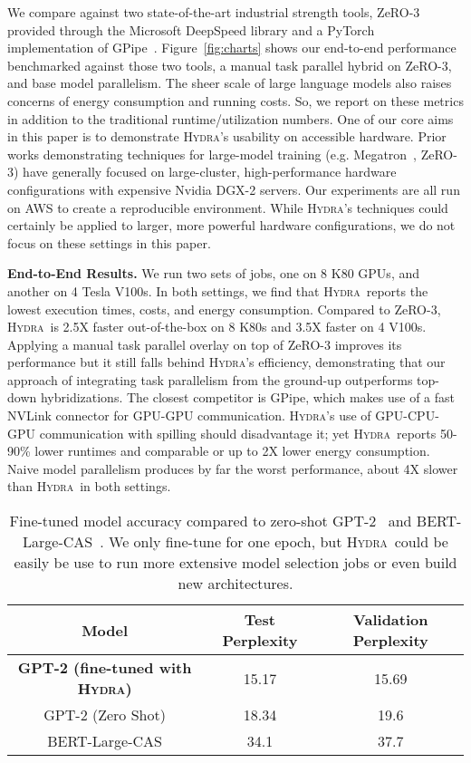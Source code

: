 \documentclass{article}
\newcommand{\system}{\textsc{Hydra}}
\begin{document}
{{We compare against two state-of-the-art industrial strength tools, ZeRO-3~\cite{zeroOpt,zeroDeep} provided through the Microsoft DeepSpeed library and a PyTorch implementation of GPipe~\cite{gpipe,torchgpipe}. Figure~\ref{fig:charts} shows our end-to-end performance benchmarked against those two tools, a manual task parallel hybrid on ZeRO-3, and base model parallelism. The sheer scale of large language models also raises concerns of energy consumption and running costs. So, we report on these metrics in addition to the traditional runtime/utilization numbers. One of our core aims in this paper is to demonstrate \system's usability on accessible hardware. Prior works demonstrating techniques for large-model training (e.g. Megatron~\cite{shoeybi2019megatron}, ZeRO-3) have generally focused on large-cluster, high-performance hardware configurations with expensive Nvidia DGX-2 servers. Our experiments are all run on AWS to create a reproducible environment. While \system's techniques could certainly be applied to larger, more powerful hardware configurations, we do not focus on these settings in this paper. 

\textbf{End-to-End Results.} We run two sets of jobs, one on 8 K80 GPUs, and another on 4 Tesla V100s.  In both settings, we find that \system~reports the lowest execution times, costs, and energy consumption. Compared to ZeRO-3, \system~is 2.5X faster out-of-the-box on 8 K80s and 3.5X faster on 4 V100s. Applying a manual task parallel overlay on top of ZeRO-3 improves its performance but it still falls behind \system's efficiency, demonstrating that our approach of integrating task parallelism from the ground-up outperforms top-down hybridizations. The closest competitor is GPipe, which makes use of a fast NVLink connector for GPU-GPU communication. \system's use of GPU-CPU-GPU communication with spilling should disadvantage it; yet \system~reports 50-90\% lower runtimes and comparable or up to 2X lower energy consumption. Naive model parallelism produces by far the worst performance, about 4X slower than \system~in both settings.

\begin{table}
\label{tb:accuracy}
\centering
\begin{tabular}{ c c c }
Model & Test Perplexity & Validation Perplexity\\ [0.5ex] 
 \hline\hline
  \textbf{GPT-2 (fine-tuned with \system)} & 15.17 & 15.69 \\    
 GPT-2 (Zero Shot) & 18.34 & 19.6 \\ 
 BERT-Large-CAS & 34.1 & 37.7 \\    
\end{tabular}
\vspace{1.5mm}
 \caption{Fine-tuned model accuracy compared to zero-shot GPT-2~\cite{radford2019language} and BERT-Large-CAS~\cite{wang2019cas}. We only fine-tune for one epoch, but \system~could be easily be use to run more extensive model selection jobs or even build new architectures.}
\end{table}

}}
\end{document}
